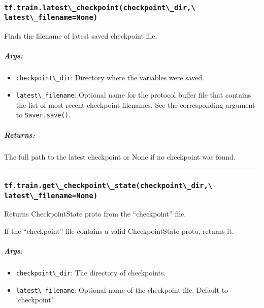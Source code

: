 \subsubsection{\texorpdfstring{\lstinline{tf.train.latest\_checkpoint(checkpoint\_dir,\ latest\_filename=None)}
}{tf.train.latest\_checkpoint(checkpoint\_dir, latest\_filename=None) }}\label{tf.train.latestux5fcheckpointcheckpointux5fdir-latestux5ffilenamenone}

Finds the filename of latest saved checkpoint file.

\subparagraph{Args: }\label{args-13}

\begin{itemize}
\tightlist
\item
  \lstinline{checkpoint\_dir}: Directory where the variables were saved.
\item
  \lstinline{latest\_filename}: Optional name for the protocol buffer file
  that contains the list of most recent checkpoint filenames. See the
  corresponding argument to \lstinline{Saver.save()}.
\end{itemize}

\subparagraph{Returns: }\label{returns-17}

The full path to the latest checkpoint or None if no checkpoint was
found.

\begin{center}\rule{0.5\linewidth}{\linethickness}\end{center}

\subsubsection{\texorpdfstring{\lstinline{tf.train.get\_checkpoint\_state(checkpoint\_dir,\ latest\_filename=None)}
}{tf.train.get\_checkpoint\_state(checkpoint\_dir, latest\_filename=None) }}\label{tf.train.getux5fcheckpointux5fstatecheckpointux5fdir-latestux5ffilenamenone}

Returns CheckpointState proto from the ``checkpoint'' file.

If the ``checkpoint'' file contains a valid CheckpointState proto,
returns it.

\subparagraph{Args: }\label{args-14}

\begin{itemize}
\tightlist
\item
  \lstinline{checkpoint\_dir}: The directory of checkpoints.
\item
  \lstinline{latest\_filename}: Optional name of the checkpoint file.
  Default to `checkpoint'.
\end{itemize}

